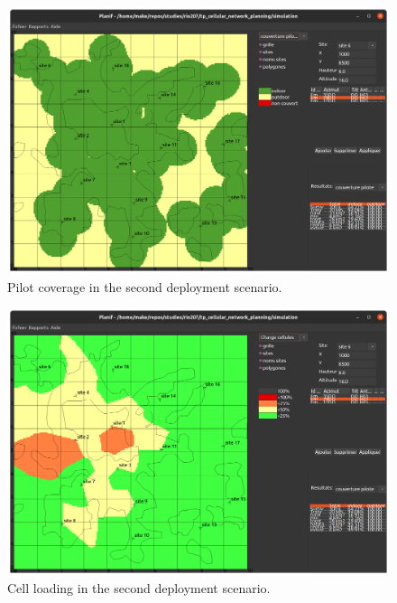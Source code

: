 \documentclass{article}
\begin{document}
\begin{figure}[!htb]
    \centering
    \includegraphics[width=12cm]{images/q8_pilot_coverage.png}
    \caption{Pilot coverage in the second deployment scenario.}
    \label{fig:q8_pilot_coverage}
\end{figure}

\begin{figure}[!htb]
    \centering
    \includegraphics[width=12cm]{images/q8_cell_loading.png}
    \caption{Cell loading in the second deployment scenario.}
    \label{fig:q8_cell_loading}
\end{figure}
\end{document}
